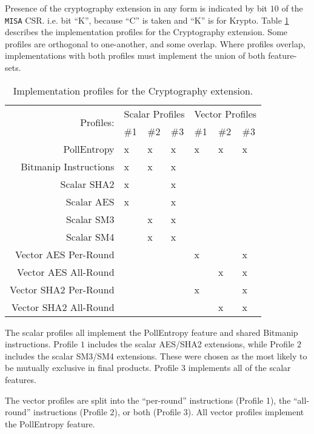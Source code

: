 
Presence of the cryptography extension in any form is indicated
by bit $10$ of the {\tt MISA} CSR.
i.e. bit ``K'', because ``C'' is taken and ``K'' is for Krypto.
Table \ref{tab:profiles} describes the implementation profiles for the
Cryptography extension.
Some profiles are orthogonal to one-another, and some overlap.
Where profiles overlap, implementations with both profiles must
implement the union of both feature-sets.


\begin{table}[h]
\centering
\begin{tabular}{r|lll|lll}
\multirow{2}{*}{Profiles:} &
\multicolumn{3}{c|}{Scalar Profiles} &
\multicolumn{3}{c}{Vector Profiles} \\
                      & \#1  & \#2  & \#3 & \#1  & \#2  & \#3 \\
\hline
PollEntropy            &   x  &   x  &  x  &   x  &  x   &  x  \\
Bitmanip Instructions &   x  &   x  &  x  &      &      &     \\
Scalar SHA2           &   x  &      &  x  &      &      &     \\
Scalar AES            &   x  &      &  x  &      &      &     \\
Scalar SM3            &      &   x  &  x  &      &      &     \\
Scalar SM4            &      &   x  &  x  &      &      &     \\
\hline
Vector AES Per-Round  &      &      &     &   x  &      &  x  \\
Vector AES All-Round  &      &      &     &      &  x   &  x  \\
Vector SHA2 Per-Round &      &      &     &   x  &      &  x  \\
Vector SHA2 All-Round &      &      &     &      &  x   &  x  
\end{tabular}
\caption{
Implementation profiles for the Cryptography extension.
}
\label{tab:profiles}
\end{table}

The scalar profiles all implement the PollEntropy feature and
shared Bitmanip instructions.
Profile $1$ includes the scalar AES/SHA2 extensions, while
Profile $2$ includes the scalar SM3/SM4  extensions.
These were chosen as the most likely to be mutually exclusive in final
products.
Profile $3$ implements all of the scalar features.

The vector profiles are split into the ``per-round'' instructions
(Profile 1),
the ``all-round'' instructions (Profile 2),
or both (Profile 3).
All vector profiles implement the PollEntropy feature.
